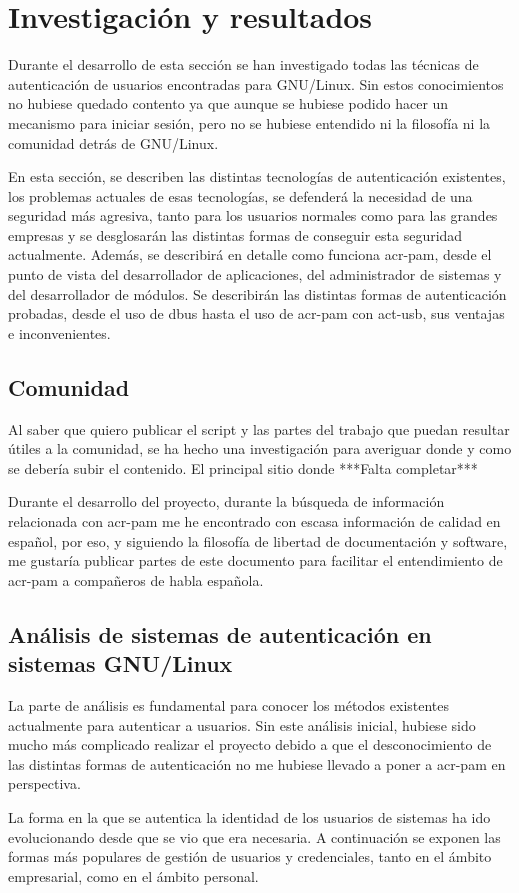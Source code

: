 \documentclass[titlepage, 12pt, a4paper]{article}
\begin{document}
\section{Investigación y resultados}
Durante el desarrollo de esta sección se han investigado todas las técnicas de autenticación de usuarios encontradas para \gls{GNU/Linux}. Sin estos conocimientos no hubiese quedado contento ya que aunque se hubiese podido hacer un mecanismo para iniciar sesión, pero no se hubiese entendido ni la filosofía ni la comunidad detrás de \gls{GNU/Linux}. \par
En esta sección, se describen las distintas tecnologías de autenticación existentes, los problemas actuales de esas tecnologías, se defenderá la necesidad de una seguridad más agresiva, tanto para los usuarios normales como para las grandes empresas y se desglosarán las distintas formas de conseguir esta seguridad actualmente. Además, se describirá en detalle como funciona \gls{acr-pam}, desde el punto de vista del desarrollador de aplicaciones, del administrador de sistemas y del desarrollador de módulos. Se describirán las distintas formas de autenticación probadas, desde el uso de \gls{dbus} hasta el uso de \gls{acr-pam} con \gls{act-usb}, sus ventajas e inconvenientes.
\subsection{Comunidad}
Al saber que quiero publicar el script y las partes del trabajo que puedan resultar útiles a la comunidad, se ha hecho una investigación para averiguar donde y como se debería subir el contenido. El principal sitio donde ***Falta completar***\par
Durante el desarrollo del proyecto, durante la búsqueda de información relacionada con \gls{acr-pam} me he encontrado con escasa información de calidad en español, por eso, y siguiendo la filosofía de libertad de documentación y software, me gustaría publicar partes de este documento para facilitar el entendimiento de \gls{acr-pam} a compañeros de habla española.
\subsection{Análisis de sistemas de autenticación en sistemas \gls{GNU/Linux}}
La parte de análisis es fundamental para conocer los métodos existentes actualmente para autenticar a usuarios. Sin este análisis inicial, hubiese sido mucho más complicado realizar el proyecto debido a que el desconocimiento de las distintas formas de autenticación no me hubiese llevado a poner a \gls{acr-pam} en perspectiva. \par
La forma en la que se autentica la identidad de los usuarios de sistemas ha ido evolucionando desde que se vio que era necesaria. A continuación se exponen las formas más populares de gestión de usuarios y credenciales, tanto en el ámbito empresarial, como en el ámbito personal.
\end{document}
